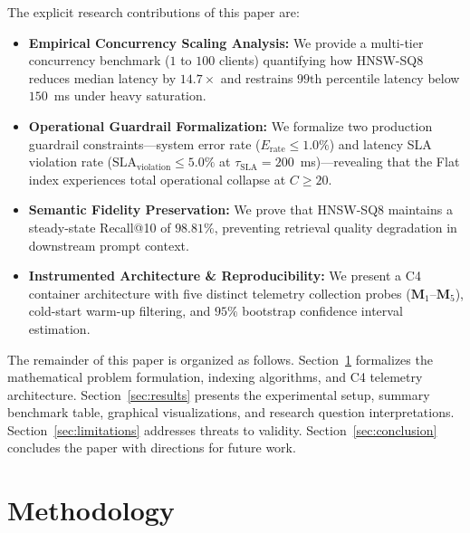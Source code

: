 \documentclass[conference]{IEEEtran}
\begin{document}
The explicit research contributions of this paper are:
\begin{itemize}
    \item \textbf{Empirical Concurrency Scaling Analysis:} We provide a multi-tier concurrency benchmark ($1$ to $100$ clients) quantifying how HNSW-SQ8 reduces median latency by $14.7\times$ and restrains $99\text{th}$ percentile latency below $150$~ms under heavy saturation.
    \item \textbf{Operational Guardrail Formalization:} We formalize two production guardrail constraints---system error rate ($E_{\text{rate}} \le 1.0\%$) and latency SLA violation rate ($\text{SLA}_{\text{violation}} \le 5.0\%$ at $\tau_{\text{SLA}} = 200$~ms)---revealing that the Flat index experiences total operational collapse at $C \ge 20$.
    \item \textbf{Semantic Fidelity Preservation:} We prove that HNSW-SQ8 maintains a steady-state Recall@10 of $98.81\%$, preventing retrieval quality degradation in downstream prompt context.
    \item \textbf{Instrumented Architecture \& Reproducibility:} We present a C4 container architecture with five distinct telemetry collection probes ($\mathbf{M}_1$--$\mathbf{M}_5$), cold-start warm-up filtering, and $95\%$ bootstrap confidence interval estimation.
\end{itemize}

The remainder of this paper is organized as follows. Section~\ref{sec:methodology} formalizes the mathematical problem formulation, indexing algorithms, and C4 telemetry architecture. Section~\ref{sec:results} presents the experimental setup, summary benchmark table, graphical visualizations, and research question interpretations. Section~\ref{sec:limitations} addresses threats to validity. Section~\ref{sec:conclusion} concludes the paper with directions for future work.

\section{Methodology}
\label{sec:methodology}
\end{document}
